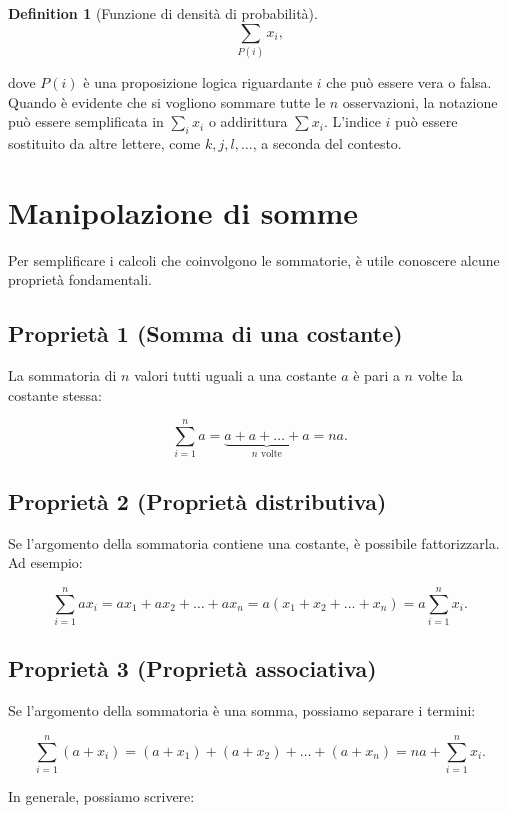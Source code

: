 \documentclass[
  letterpaper,
  DIV=11,
  numbers=noendperiod,
  oneside]{scrreprt}
\theoremstyle{definition}
\theoremstyle{plain}
\theoremstyle{definition}
\newtheorem{definition}{Definition}[chapter]
\theoremstyle{remark}
\begin{document}
\begin{definition}[Funzione di densità di
probabilità]
\[
\sum_{P(i)} x_i,
\]

dove \(P(i)\) è una proposizione logica riguardante \(i\) che può essere
vera o falsa. Quando è evidente che si vogliono sommare tutte le \(n\)
osservazioni, la notazione può essere semplificata in \(\sum_{i} x_i\) o
addirittura \(\sum x_i\). L'indice \(i\) può essere sostituito da altre
lettere, come \(k, j, l, \dots\), a seconda del contesto.

\section{Manipolazione di somme}\label{manipolazione-di-somme}

Per semplificare i calcoli che coinvolgono le sommatorie, è utile
conoscere alcune proprietà fondamentali.

\subsection{Proprietà 1 (Somma di una
costante)}\label{proprietuxe0-1-somma-di-una-costante}

La sommatoria di \(n\) valori tutti uguali a una costante \(a\) è pari a
\(n\) volte la costante stessa:

\[
\sum_{i=1}^{n} a = \underbrace{a + a + \dots + a}_{n \text{ volte}} = n a.
\]

\subsection{Proprietà 2 (Proprietà
distributiva)}\label{proprietuxe0-2-proprietuxe0-distributiva}

Se l'argomento della sommatoria contiene una costante, è possibile
fattorizzarla. Ad esempio:

\[
\sum_{i=1}^{n} a x_i = a x_1 + a x_2 + \dots + a x_n = a (x_1 + x_2 + \dots + x_n) = a \sum_{i=1}^{n} x_i.
\]

\subsection{Proprietà 3 (Proprietà
associativa)}\label{proprietuxe0-3-proprietuxe0-associativa}

Se l'argomento della sommatoria è una somma, possiamo separare i
termini:

\[
\sum_{i=1}^{n} (a + x_i) = (a + x_1) + (a + x_2) + \dots + (a + x_n) = n a + \sum_{i=1}^{n} x_i.
\]

In generale, possiamo scrivere:


\end{definition}
\end{document}
